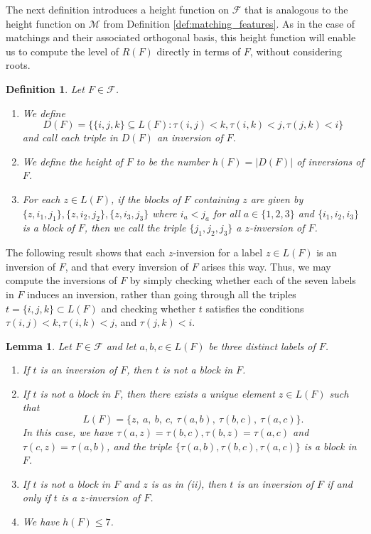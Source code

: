 \documentclass[10pt,a4paper]{amsart}
\newtheorem{lemma}[theorem]{Lemma}
\newtheorem{defn}[theorem]{Definition}
\numberwithin{equation}{section}
\newcommand{\calf}{\mathcal{F}}
\newcommand{\calm}{\mathcal{M}}
\newcommand{\se}{\subseteq}
\newcommand{\abs}[1]{\lvert #1 \rvert}
\begin{document}
The next definition introduces a height function on $\calf$ that is analogous to
the height function on $\calm$ from Definition \ref{def:matching_features}. As
in the case of matchings and their associated orthogonal basis, this height
function will enable us to compute the level of $R(F)$ directly in terms of $F$,
without considering roots.


\begin{defn}
  \label{def:fob_height}
Let $F\in \calf$.
\begin{enumerate}
  \item We define 
    \[
      D(F)=\{\{i,j,k\}\se L(F): \tau(i,j)<k, \tau(i,k)<j, \tau(j,k)<i\}
    \]
    and call each triple in $D(F)$ an \emph{inversion} of $F$. 

  \item We define the \emph{height} of $F$ to be the number $h(F)=\abs{D(F)}$ of
    inversions of $F$.

\item For each $z\in L(F)$, if the blocks of $F$ containing $z$ are given
  by $\{z,i_1,j_1\}, \{z,i_2,j_2\}, \{z,i_3,j_3\}$ where $i_a<j_a$ for all $a\in
  \{1,2,3\}$ and $\{i_1,i_2,i_3\}$ is a block of $F$, then we call the
  triple $\{j_1,j_2,j_3\}$ a \emph{$z$-inversion of $F$}.
\end{enumerate}
\end{defn} 

The following result shows that each $z$-inversion for a label $z\in L(F)$ is an
inversion of $F$, and that every inversion of $F$ arises this way. Thus, we may compute the inversions of
$F$ by simply checking whether each of the seven labels in $F$ induces an
inversion, rather than going through all the triples $t=\{i,j,k\}\subset L(F)$
and checking whether $t$ satisfies the conditions $\tau(i,j)<k, \tau(i,k)<j$,
and $\tau(j,k)<i$.

\begin{lemma}\label{lem:fano_inv}
Let $F \in \calf$ and let $a,b,c\in L(F)$ be three distinct labels of $F$.
\begin{enumerate}
\item{If $t$ is an inversion of $F$, then $t$ is not a block in $F$.}

\item If $t$ is not a block in $F$, then there exists a unique element
    $z\in L(F)$ such that
    \[
    L(F) = \{z, \ a, \ b, \ c, \ \tau(a, b), \ \tau(b, c), \ \tau(a, c)\}.
  \] 
  In this case, we have $\tau(a,z)=\tau(b,c), \tau(b,z)=\tau(a,c)$ and
  $\tau(c,z)=\tau(a,b)$, and the triple $\{\tau(a,b),\tau(b,c),\tau(a,c)\}$ is a
  block in $F$.

\item If $t$ is not a block in $F$ and $z$ is as in (ii), then $t$ is an
  inversion of $F$ if and only if $t$ is a $z$-inversion of $F$.

\item We have $h(F)\le 7$.
\end{enumerate}
\end{lemma}
\end{document}
